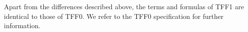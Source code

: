 %
%
%
%

 Apart from the differences described above,
the terms and formulas of TFF1 are identical to those of TFF0. We refer to the
TFF0 specification \cite{TFF0} for further information.

